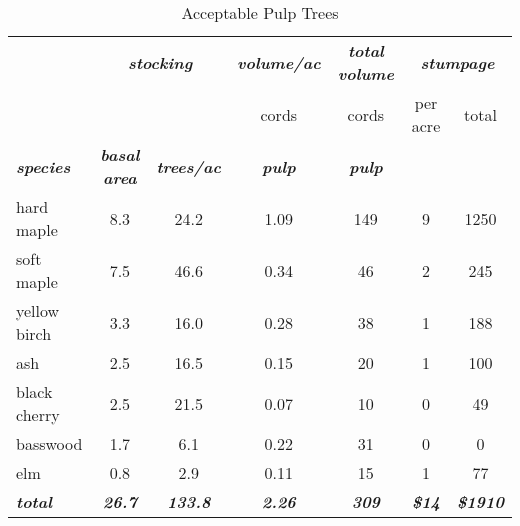 \documentclass[landscape]{article}
\begin{document}
\begin{table}[H]

\caption{\label{tab:unnamed-chunk-21}Acceptable Pulp Trees}
\fontsize{10}{12}\selectfont
\begin{tabular}[t]{lcccccc}
\toprule
\multicolumn{1}{c}{\em{\textbf{ }}} & \multicolumn{2}{c}{\em{\textbf{stocking}}} & \multicolumn{1}{c}{\em{\textbf{volume/ac }}} & \multicolumn{1}{c}{\em{\textbf{total volume}}} & \multicolumn{2}{c}{\em{\textbf{stumpage}}} \\
\cmidrule(l{3pt}r{3pt}){2-3} \cmidrule(l{3pt}r{3pt}){4-4} \cmidrule(l{3pt}r{3pt}){5-5} \cmidrule(l{3pt}r{3pt}){6-7}
\multicolumn{3}{c}{ } & \multicolumn{1}{c}{cords} & \multicolumn{1}{c}{cords} & \multicolumn{1}{c}{per acre} & \multicolumn{1}{c}{total} \\
\cmidrule(l{3pt}r{3pt}){4-4} \cmidrule(l{3pt}r{3pt}){5-5} \cmidrule(l{3pt}r{3pt}){6-6} \cmidrule(l{3pt}r{3pt}){7-7}
\rowcolor[HTML]{DCDCDC}  \em{\textbf{species}} & \em{\textbf{basal area}} & \em{\textbf{trees/ac}} & \em{\textbf{pulp}} & \em{\textbf{pulp}} & \em{\textbf{ }} & \em{\textbf{ }}\\
\midrule
\rowcolor{gray!6}  hard maple & 8.3 & 24.2 & 1.09 & 149 & 9 & 1250\\
 
soft maple & 7.5 & 46.6 & 0.34 & 46 & 2 & 245\\
 
\rowcolor{gray!6}  yellow birch & 3.3 & 16.0 & 0.28 & 38 & 1 & 188\\
 
ash & 2.5 & 16.5 & 0.15 & 20 & 1 & 100\\
 
\rowcolor{gray!6}  black cherry & 2.5 & 21.5 & 0.07 & 10 & 0 & 49\\
 
basswood & 1.7 & 6.1 & 0.22 & 31 & 0 & 0\\
 
\rowcolor{gray!6}  elm & 0.8 & 2.9 & 0.11 & 15 & 1 & 77\\
 
\rowcolor[HTML]{DCDCDC}  \em{\textbf{total}} & \em{\textbf{26.7}} & \em{\textbf{133.8}} & \em{\textbf{2.26}} & \em{\textbf{309}} & \em{\textbf{\$14}} & \em{\textbf{\$1910}}\\
\bottomrule
\end{tabular}
\end{table}
\end{document}
